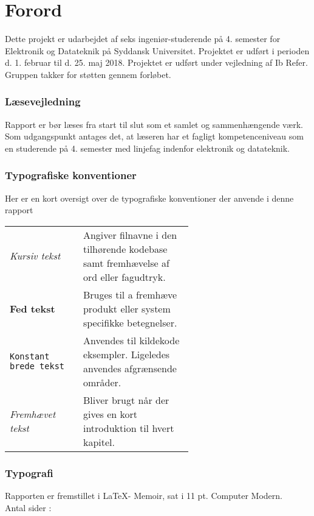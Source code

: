 \chapter*{Forord}\label{chap:forord}
Dette projekt er udarbejdet af seks ingeniør-studerende på 4. semester for Elektronik og Datateknik på Syddansk Universitet. 
Projektet er udført i perioden d. 1. februar til d. 25. maj 2018. 
Projektet er udført under vejledning af Ib Refer. Gruppen takker for støtten gennem forløbet. 


\subsection{Læsevejledning}
Rapport er bør læses fra start til slut som et samlet og sammenhængende værk. 
Som udgangspunkt antages det, at læseren har et fagligt kompetenceniveau som en studerende på 4. semester med linjefag indenfor elektronik og datateknik.

\subsection{Typografiske konventioner}
Her er en kort oversigt over de typografiske konventioner der anvende i denne rapport\\
\begin{tabular}{l p{0.6\linewidth}}
	\textit{Kursiv tekst}			& Angiver filnavne i den tilhørende kodebase samt fremhævelse af ord eller fagudtryk. \\
	\textbf{Fed tekst}				& Bruges til a fremhæve produkt eller system specifikke betegnelser.\\
	\texttt{Konstant brede tekst}	& Anvendes til kildekode eksempler. Ligeledes anvendes afgrænsende områder.\\
	\emph{Fremhævet tekst}		    & Bliver brugt når der gives en kort introduktion til hvert kapitel.\\
\end{tabular}

\subsection{Typografi}
Rapporten er fremstillet i \LaTeX - Memoir, sat i 11 pt. Computer Modern.\\
Antal sider : \pageref{LastPage}